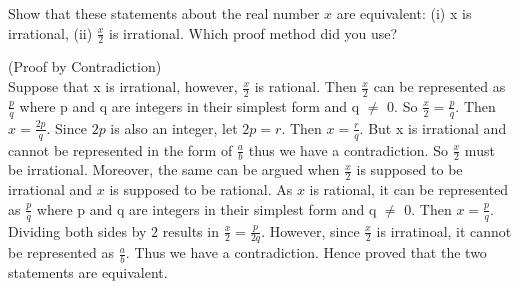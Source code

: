 \documentclass[addpoints]{exam}
\begin{document}
\begin{questions}

\question[5]
  Show that these statements about the real number $x$ are equivalent: (i) x is irrational, (ii)  $\frac{x}{2}$ is irrational. Which proof method did you use?

  \begin{solution}
    (Proof by Contradiction) \\
    Suppose that x is irrational, however, $\frac{x}{2}$ is rational. Then $\frac{x}{2}$ can be represented as $\frac{p}{q}$ where p and q
    are integers in their simplest form and q $\neq$ 0. So $\frac{x}{2} = \frac{p}{q}$. Then $x = \frac{2p}{q}$. Since $2p$ is also an integer,
    let $2p = r$. Then $x = \frac{r}{q}$. But x is irrational and cannot be represented in the form of $\frac{a}{b}$ thus we have a contradiction.
    So $\frac{x}{2}$ must be irrational. Moreover, the same can be argued when $\frac{x}{2}$ is supposed to be irrational and $x$ is supposed to be rational. 
    As $x$ is rational, it can be represented as $\frac{p}{q}$ where p and q are integers in their simplest form and q $\neq$ 0. Then $x = \frac{p}{q}$.
    Dividing both sides by $2$ results in $\frac{x}{2} = \frac{p}{2q}$. However, since $\frac{x}{2}$ is irratinoal, it cannot be represented as $\frac{a}{b}$. Thus 
    we have a contradiction. Hence proved that the two statements are equivalent. 
  \end{solution}


\end{questions}
\end{document}
